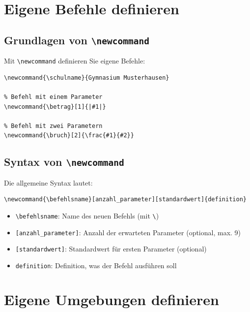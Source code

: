 \section{Eigene Befehle definieren}



\subsection{Grundlagen von \texttt{\textbackslash newcommand}}

Mit \texttt{\textbackslash newcommand} definieren Sie eigene Befehle:

\begin{lstlisting}[style=latex]
% Einfacher Befehl ohne Parameter
\newcommand{\schulname}{Gymnasium Musterhausen}

% Befehl mit einem Parameter
\newcommand{\betrag}[1]{|#1|}

% Befehl mit zwei Parametern
\newcommand{\bruch}[2]{\frac{#1}{#2}}
\end{lstlisting}



\subsection{Syntax von \texttt{\textbackslash newcommand}}

Die allgemeine Syntax lautet:

\begin{lstlisting}[style=latex]
\newcommand{\befehlsname}[anzahl_parameter][standardwert]{definition}
\end{lstlisting}

\begin{itemize}
    \item \texttt{\textbackslash befehlsname}: Name des neuen Befehls (mit \texttt{\textbackslash})
    \item \texttt{[anzahl\_parameter]}: Anzahl der erwarteten Parameter (optional, max. 9)
    \item \texttt{[standardwert]}: Standardwert für ersten Parameter (optional)
    \item \texttt{definition}: Definition, was der Befehl ausführen soll
\end{itemize}



\section{Eigene Umgebungen definieren}



